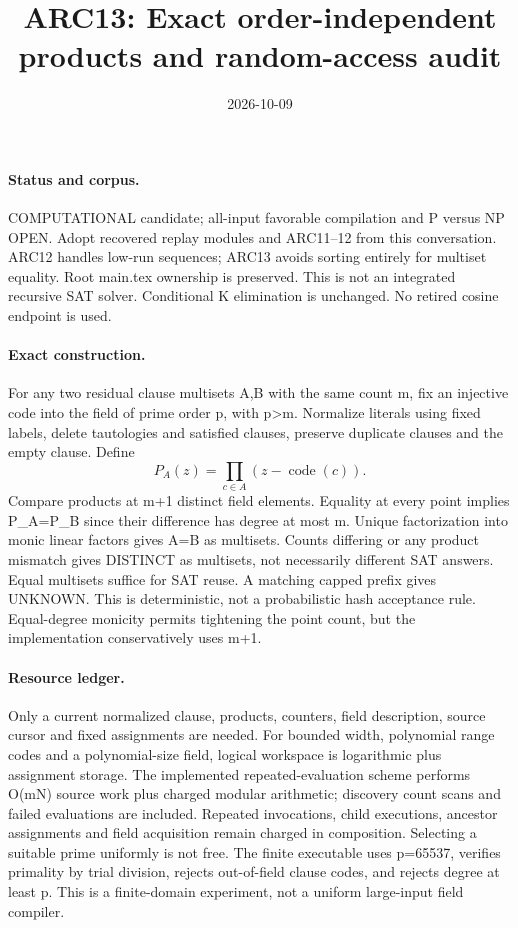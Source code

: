 \documentclass{article}
\title{ARC13: Exact order-independent products and random-access audit}
\date{2026-10-09}
\begin{document}
\maketitle
\paragraph{Status and corpus.}
COMPUTATIONAL candidate; all-input favorable compilation and P versus NP OPEN.
Adopt recovered replay modules and ARC11--12 from this conversation.
ARC12 handles low-run sequences; ARC13 avoids sorting entirely for
multiset equality. Root main.tex ownership is preserved.
This is not an integrated recursive SAT solver. Conditional K elimination
is unchanged. No retired cosine endpoint is used.

\paragraph{Exact construction.}
For any two residual clause multisets A,B with the same count m,
fix an injective code into the field of prime order p, with p>m.
Normalize literals using fixed labels, delete tautologies and satisfied
clauses, preserve duplicate clauses and the empty clause. Define
\[
 P_A(z)=\prod_{c\in A}(z-\operatorname{code}(c)).
\]
Compare products at m+1 distinct field elements. Equality at every point
implies P_A=P_B since their difference has degree at most m.
Unique factorization into monic linear factors gives A=B as multisets.
Counts differing or any product mismatch gives DISTINCT as multisets,
not necessarily different SAT answers. Equal multisets suffice for SAT reuse.
A matching capped prefix gives UNKNOWN. This is deterministic, not a
probabilistic hash acceptance rule. Equal-degree monicity permits tightening
the point count, but the implementation conservatively uses m+1.

\paragraph{Resource ledger.}
Only a current normalized clause, products, counters, field description,
source cursor and fixed assignments are needed. For bounded width, polynomial
range codes and a polynomial-size field, logical workspace is logarithmic
plus assignment storage. The implemented repeated-evaluation scheme performs
O(mN) source work plus charged modular arithmetic; discovery count scans and
failed evaluations are included. Repeated invocations, child executions,
ancestor assignments and field acquisition remain charged in composition.
Selecting a suitable prime uniformly is not free. The finite executable
uses p=65537, verifies primality by trial division, rejects out-of-field
clause codes, and rejects degree at least p. This is a finite-domain
experiment, not a uniform large-input field compiler.
\end{document}
